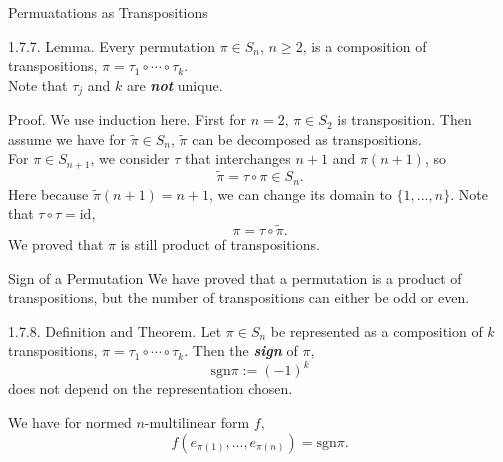 \documentclass[hyperref={pdfpagelabels=true}]{beamer}
\newcommand{\highlightr}[1]{\textcolor[rgb]{1,0.3,0.2}{\emph{\textbf{#1}}}}
\newcommand{\highlightg}[1]{\textcolor[rgb]{0.1,0.5,0.3}{\emph{\textbf{#1}}}}
\newcommand{\<}{\langle}
\renewcommand{\>}{\rangle}
\newenvironment{shrinkeq}[1]%
{ \bgroup
  \addtolength\abovedisplayshortskip{#1}
  \addtolength\abovedisplayskip{#1}
  \addtolength\belowdisplayshortskip{#1}
  \addtolength\belowdisplayskip{#1}}
{\egroup\ignorespacesafterend}
\begin{document}
    \begin{frame}{Permuatations as Transpositions}
        \begin{block}{1.7.7. Lemma.}
            Every permutation $\pi \in S_{n}$, $n \geq 2$, is a composition of transpositions, $\pi = \tau_{1} \circ \cdots \circ \tau_{k}$.\\
            Note that $\tau_{j}$ and $k$ are \highlightr{not} unique.
        \end{block}
        \begin{block}{Proof.}
            We use induction here. First for $n = 2$, $\pi \in S_{2}$ is transposition. Then assume we have for $\tilde{\pi} \in S_{n}$, $\tilde{\pi}$ can be decomposed as transpositions.\\
            For $\pi \in S_{n+1}$, we consider $\tau$ that interchanges $n+1$ and $\pi(n+1)$, so 
            \begin{shrinkeq}{-0.3em}
            \[\tilde{\pi} = \tau \circ \pi \in S_{n}.\]
            \end{shrinkeq}
            Here because $\tilde{\pi}(n+1) = n+1$, we can change its domain to $\{1,...,n\}$. 
            Note that $\tau \circ \tau = \text{id}$,
            \begin{shrinkeq}{-0.3em}
            \[\pi = \tau \circ \tilde{\pi}.\]
            \end{shrinkeq}
            We proved that $\pi$ is still product of transpositions.
        \end{block}
    \end{frame}
    \begin{frame}{Sign of a Permutation}
        We have proved that a permutation is a product of transpositions, but the number of transpositions can either be odd or even.
        \begin{block}{1.7.8. Definition and Theorem.}
            Let $\pi \in S_{n}$ be represented as a composition of $k$ transpositions, $\pi = \tau_{1} \circ \cdots \circ \tau_{k}$. Then the \highlightg{sign} of $\pi$,
            \[\text{sgn}\pi:=(-1)^{k}\]
            does not depend on the representation chosen.
        \end{block}
        We have for normed $n$-multilinear form $f$,
        \[f(e_{\pi(1)},...,e_{\pi(n)}) = \text{sgn}\pi.\]
    \end{frame}
\end{document}
